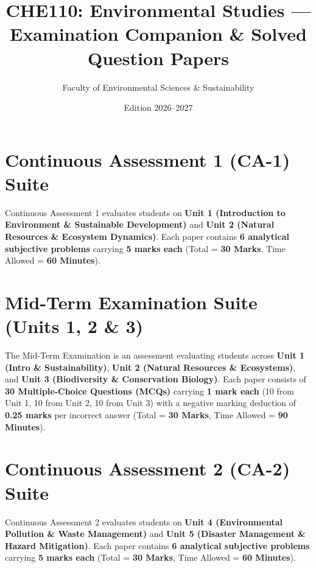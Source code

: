 \documentclass[a4paper,11pt,oneside,openany]{book}
\title{CHE110: Environmental Studies --- Examination Companion \& Solved Question Papers}
\author{Faculty of Environmental Sciences \& Sustainability}
\date{Edition 2026--2027}
\begin{document}
\frontmatter




\tableofcontents
\newpage

\mainmatter

\chapter{Continuous Assessment 1 (CA-1) Suite}
\label{chap:ca1}
\noindent
Continuous Assessment 1 evaluates students on \textbf{Unit 1 (Introduction to Environment \& Sustainable Development)} and \textbf{Unit 2 (Natural Resources \& Ecosystem Dynamics)}. Each paper contains \textbf{6 analytical subjective problems} carrying \textbf{5 marks each} (Total = \textbf{30 Marks}, Time Allowed = \textbf{60 Minutes}).

\newpage



\chapter{Mid-Term Examination Suite (Units 1, 2 \& 3)}
\label{chap:midterm}
\noindent
The Mid-Term Examination is an assessment evaluating students across \textbf{Unit 1 (Intro \& Sustainability)}, \textbf{Unit 2 (Natural Resources \& Ecosystems)}, and \textbf{Unit 3 (Biodiversity \& Conservation Biology)}. Each paper consists of \textbf{30 Multiple-Choice Questions (MCQs)} carrying \textbf{1 mark each} (10 from Unit 1, 10 from Unit 2, 10 from Unit 3) with a negative marking deduction of \textbf{0.25 marks} per incorrect answer (Total = \textbf{30 Marks}, Time Allowed = \textbf{90 Minutes}).

\newpage



\chapter{Continuous Assessment 2 (CA-2) Suite}
\label{chap:ca2}
\noindent
Continuous Assessment 2 evaluates students on \textbf{Unit 4 (Environmental Pollution \& Waste Management)} and \textbf{Unit 5 (Disaster Management \& Hazard Mitigation)}. Each paper contains \textbf{6 analytical subjective problems} carrying \textbf{5 marks each} (Total = \textbf{30 Marks}, Time Allowed = \textbf{60 Minutes}).
\end{document}
